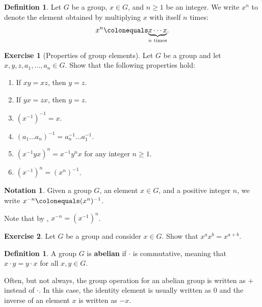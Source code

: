 \documentclass[12pt]{report}
\numberwithin{equation}{section}
\numberwithin{theorem}{chapter}
\theoremstyle{definition}
\newtheorem{definition}[theorem]{Definition}
\newtheorem{exercise}{Exercise}
\newtheorem*{basic properties}{Basic Properties}
\newtheorem*{Important Remark}{Important Remark}
\newtheorem{notation}[theorem]{Notation}
\begin{document}
\begin{definition}
	Let $G$ be a group, $x \in G$, and $n \geqslant 1$ be an integer. We write $x^n$ to denote the element obtained by multiplying $x$ with itself $n$ times:
	$$x^n \colonequals \underset{n \textrm{ times}}{\underbrace{x \cdots x}}.$$
\end{definition}

\newpage

\begin{exercise}[Properties of group elements]\label{exercise properties of group elements}
Let $G$ be a group and let $x,y,z, a_1,\ldots,a_n \in G$. Show that the following properties hold: 
\begin{enumerate}
\item If $xy = xz$, then $y=z$. 
\item If $yx = zx$, then $y = z$. 
\item $(x^{-1})^{-1} = x$. 
\item $(a_1 \dots a_n)^{-1} = a_n^{-1} \dots a_1^{-1}$. 
\item $(x^{-1}yx)^n = x^{-1}y^nx$ for any integer $n \geqslant 1$.
\item $(x^{-1})^n = (x^n)^{-1}$.
\end{enumerate}
\end{exercise}

\begin{notation}
	Given a group $G$, an element $x \in G$, and a positive integer $n$, we write $x^{-n} \colonequals (x^n)^{-1}$.
\end{notation}

Note that by , $x^{-n} = (x^{-1})^n$.

\begin{exercise}
	Let $G$ be a group and consider $x \in G$. Show that $x^ax^b = x^{a+b}$.
\end{exercise}

\begin{definition}
	A group $G$ is {\bf abelian} if $\cdot$ is commutative, meaning that $x \cdot y = y \cdot x$ for all $x,y \in G$.
\end{definition}

Often, but not always, the group operation for an abelian group is written as $+$ instead of $\cdot$. In this case, the identity element is usually written as $0$ and the inverse of an element $x$ is written as $-x$. 
\end{document}
